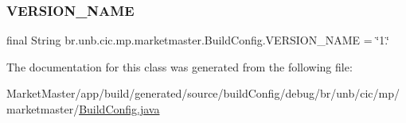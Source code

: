 \subsubsection{\texorpdfstring{V\+E\+R\+S\+I\+O\+N\+\_\+\+N\+A\+ME}{VERSION\_NAME}}
{\footnotesize\ttfamily final String br.\+unb.\+cic.\+mp.\+marketmaster.\+Build\+Config.\+V\+E\+R\+S\+I\+O\+N\+\_\+\+N\+A\+ME = \char`\"{}1.\char`\"{}\hspace{0.3cm}{\ttfamily [static]}}



The documentation for this class was generated from the following file\+:\begin{DoxyCompactItemize}
\item 
Market\+Master/app/build/generated/source/build\+Config/debug/br/unb/cic/mp/marketmaster/\mbox{\hyperlink{debug_2br_2unb_2cic_2mp_2marketmaster_2BuildConfig_8java}{Build\+Config.\+java}}\end{DoxyCompactItemize}
